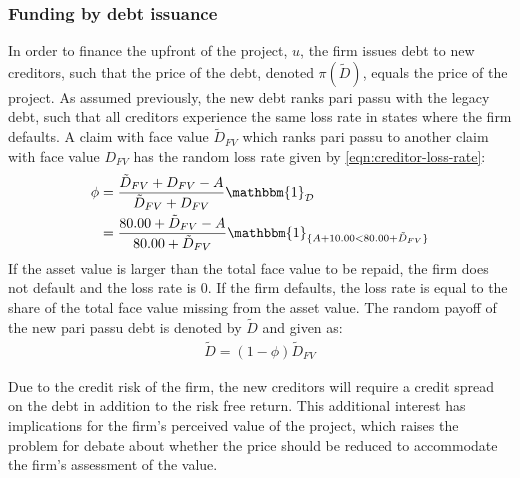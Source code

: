 \documentclass[main.tex]{subfiles}
\begin{document}
    \subsubsection{Funding by debt issuance}\label{sec:example-risk-free-project-debt-issuance}
        In order to finance the upfront of the project, $u$, the firm issues debt to new creditors, 
        such that the price of the debt, denoted $\pi(\tilde{D})$, equals the price of the project.
        As assumed previously, the new debt ranks pari passu with the legacy debt, 
        such that all creditors experience the same loss rate in states where the firm defaults.
        A claim with face value $\tilde{D}_{FV}$ which ranks pari passu to another claim 
        with face value $D_{FV}$ has the random loss rate given by \cref{eqn:creditor-loss-rate}:
            \begin{align}
                \phi
                &=
                    \frac{
                        \tilde{D}_{FV} + D_{FV} - A
                    }{
                        \tilde{D}_{FV} + D_{FV}
                    }
                    \mathbbm{1}_{\mathcal{D}}
                \nonumber \\
                &=
                    \frac{
                        80.00 + \tilde{D}_{FV} - A
                    }{
                        80.00 + \tilde{D}_{FV}
                    }
                    \mathbbm{1}_{\{A + 10.00 < 80.00 + \tilde{D}_{FV}\}} 
            \end{align}
        If the asset value is larger than the total face value to be repaid,
        the firm does not default and the loss rate is $0$.
        If the firm defaults, the loss rate is equal to the share of the total face value missing from the asset value.
        The random payoff of the new pari passu debt is denoted by $\tilde{D}$ and given as:
            \begin{align}
                \tilde{D}
                    = (1 - \phi)\tilde{D}_{FV}
            \end{align}

        Due to the credit risk of the firm, the new creditors will require a credit spread on the debt 
        in addition to the risk free return.
        This additional interest has implications for the firm's perceived value of the project, 
        which raises the problem for debate about whether the price should be reduced 
        to accommodate the firm's assessment of the value.
\end{document}
